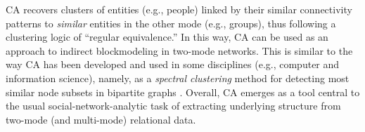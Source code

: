 CA recovers clusters of entities (e.g., people) linked by their similar connectivity patterns to \textit{similar} entities in the other mode (e.g., groups), thus following a clustering logic of ``regular equivalence.'' In this way, CA can be used as an approach to indirect blockmodeling in two-mode networks. This is similar to the way CA has been developed and used in some disciplines (e.g., computer and information science), namely, as a \textit{spectral clustering} method for detecting most similar node subsets in bipartite graphs \citep{wu2022spectral}. Overall, CA emerges as a tool central to the usual social-network-analytic task of extracting underlying structure from two-mode (and multi-mode) relational data.